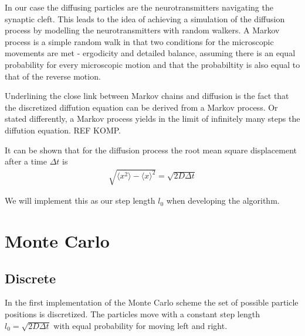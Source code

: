 \documentclass[norsk,a4paper,11pt]{article}
\begin{document}
In our case the diffusing particles are the neurotransmitters navigating the synaptic cleft.
This leads to the idea of achieving a simulation of the diffusion process by
modelling the neurotransmitters with random walkers.
A Markov process is a simple random walk in that two conditions for the microscopic movements are met
- ergodicity and detailed balance, assuming there is an equal probability for every microscopic motion and that the probabiltity
is also equal to that of the reverse motion.

Underlining the close link between Markov chains and diffusion is the fact that the discretized diffution equation can be derived
from a Markov process. Or stated differently, a Markov process yields in the limit of infinitely many steps the
diffution equation. REF KOMP.

It can be shown that for the diffusion process the root mean square displacement
after a time $\Delta t$ is
\begin{align}
    \sqrt{\langle x^2\rangle - \langle x\rangle^2} = \sqrt{2D\Delta t}
\end{align}

We will implement this as our step length $l_0$ when developing the algorithm.

\section{Monte Carlo}
\subsection{Discrete}
In the first implementation of the Monte Carlo scheme the set of possible
particle positions is discretized. The particles move with a
constant step length
$l_0 = \sqrt{2D\Delta t}$ with equal probability for moving left and right.
\end{document}
